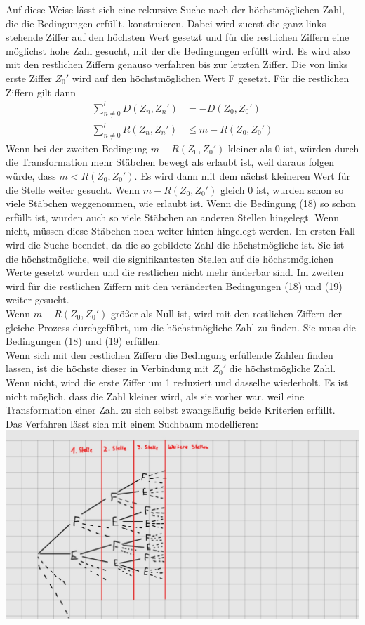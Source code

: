 \documentclass[a4paper,10pt,ngerman]{scrartcl}
\begin{document}
Auf diese Weise lässt sich eine rekursive Suche nach der höchstmöglichen Zahl, die die Bedingungen erfüllt, konstruieren. Dabei wird zuerst die ganz links stehende Ziffer auf den höchsten Wert gesetzt und für die restlichen Ziffern eine möglichst hohe Zahl gesucht, mit der die Bedingungen erfüllt wird. Es wird also mit den restlichen Ziffern genauso verfahren bis zur letzten Ziffer. Die von links erste Ziffer $Z_0'$ wird auf den höchstmöglichen Wert F gesetzt. Für die restlichen Ziffern gilt dann 
\begin{align}
\sum_{n \neq 0}^l D(Z_n, Z_n') &= -D(Z_0, Z_0') \\
\sum_{n \neq 0}^l R(Z_n, Z_n') &\leq m - R(Z_0, Z_0') 
\end{align}
Wenn bei der zweiten Bedingung $m-R(Z_0, Z_0')$ kleiner als 0 ist, würden durch die Transformation mehr Stäbchen bewegt als erlaubt ist, weil daraus folgen würde, dass $m<R(Z_0, Z_0')$. Es wird dann mit dem nächst kleineren Wert für die Stelle weiter gesucht. Wenn $m-R(Z_0, Z_0')$ gleich $0$ ist, wurden schon so viele Stäbchen weggenommen, wie erlaubt ist. Wenn die Bedingung (18) so schon erfüllt ist, wurden auch so viele Stäbchen an anderen Stellen hingelegt. Wenn nicht, müssen diese Stäbchen noch weiter hinten hingelegt werden. Im ersten Fall wird die Suche beendet, da die so gebildete Zahl die höchstmögliche ist. Sie ist die höchstmögliche, weil die signifikantesten Stellen auf die höchstmöglichen Werte gesetzt wurden und die restlichen nicht mehr änderbar sind. Im zweiten wird für die restlichen Ziffern mit den veränderten Bedingungen (18) und (19) weiter gesucht.\\
Wenn $m-R(Z_0, Z_0')$ größer als Null ist, wird mit den restlichen Ziffern der gleiche Prozess durchgeführt, um die höchstmögliche Zahl zu finden. Sie muss die Bedingungen (18) und (19) erfüllen.\\
Wenn sich mit den restlichen Ziffern die Bedingung erfüllende Zahlen finden lassen, ist die höchste dieser in Verbindung mit $Z_0'$ die höchstmögliche Zahl. Wenn nicht, wird die erste Ziffer um 1 reduziert und dasselbe wiederholt. Es ist nicht möglich, dass die Zahl kleiner wird, als sie vorher war, weil eine Transformation einer Zahl zu sich selbst zwangsläufig beide Kriterien erfüllt. \\
Das Verfahren lässt sich mit einem Suchbaum modellieren:\\
\includegraphics[width=\textwidth]{suchbaum1}\\
\end{document}
